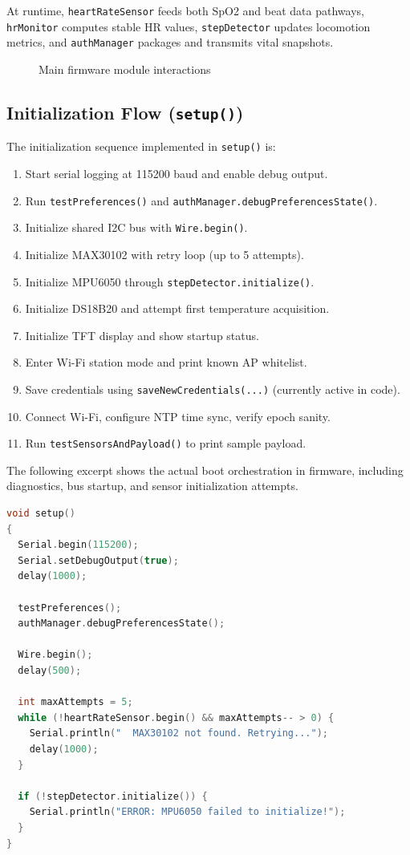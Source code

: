 \documentclass[12pt,a4paper]{report}
\begin{document}
At runtime, \texttt{heartRateSensor} feeds both SpO2 and beat data pathways, \texttt{hrMonitor} computes stable HR values, \texttt{stepDetector} updates locomotion metrics, and \texttt{authManager} packages and transmits vital snapshots.

\begin{figure}[H]
\centering
{}
\caption{Main firmware module interactions}
\label{fig:module-interactions}
\end{figure}

\subsection{Initialization Flow (\texttt{setup()})}
The initialization sequence implemented in \texttt{setup()} is:
\begin{enumerate}
  \item Start serial logging at 115200 baud and enable debug output.
  \item Run \texttt{testPreferences()} and \texttt{authManager.debugPreferencesState()}.
  \item Initialize shared I2C bus with \texttt{Wire.begin()}.
  \item Initialize MAX30102 with retry loop (up to 5 attempts).
  \item Initialize MPU6050 through \texttt{stepDetector.initialize()}.
  \item Initialize DS18B20 and attempt first temperature acquisition.
  \item Initialize TFT display and show startup status.
  \item Enter Wi-Fi station mode and print known AP whitelist.
  \item Save credentials using \texttt{saveNewCredentials(...)} (currently active in code).
  \item Connect Wi-Fi, configure NTP time sync, verify epoch sanity.
  \item Run \texttt{testSensorsAndPayload()} to print sample payload.
\end{enumerate}

The following excerpt shows the actual boot orchestration in firmware, including diagnostics, bus startup, and sensor initialization attempts.
\begin{lstlisting}[style=codestyle, language=C++]
void setup()
{
  Serial.begin(115200);
  Serial.setDebugOutput(true);
  delay(1000);

  testPreferences();
  authManager.debugPreferencesState();

  Wire.begin();
  delay(500);

  int maxAttempts = 5;
  while (!heartRateSensor.begin() && maxAttempts-- > 0) {
    Serial.println("  MAX30102 not found. Retrying...");
    delay(1000);
  }

  if (!stepDetector.initialize()) {
    Serial.println("ERROR: MPU6050 failed to initialize!");
  }
}
\end{lstlisting}
\end{document}
